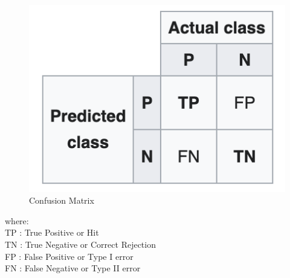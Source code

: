 \begin{figure}[h!]
\begin{center}
	\includegraphics[scale=0.5]{confuse.png}
	\caption[]{Confusion Matrix}
	\label{confusing}
	\end{center}
	\end{figure}

where:\\
TP : True Positive or Hit \\
TN : True Negative or Correct Rejection\\
FP : False Positive or Type I error\\
FN : False Negative or Type II error\\

